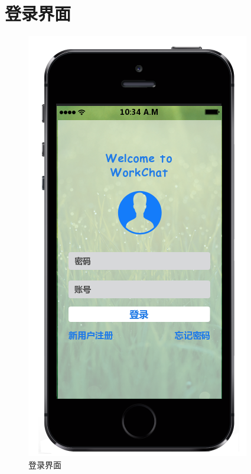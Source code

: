     \section{登录界面}
    \begin{figure}[h]
        \centering
        \includegraphics[scale=0.9]{OutlineDesign/figures/登录界面.png}
        \caption{登录界面}
        \label{fig:server_flow}
    \end{figure}
    \newpage
